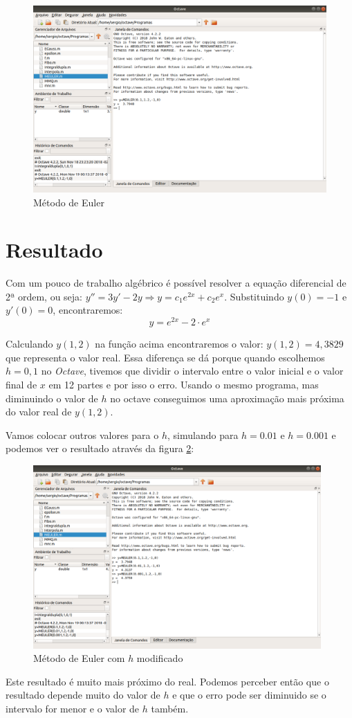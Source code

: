 \documentclass[11pt, openright, a4paper, brazil, openany, oneside]{abntex2}
\begin{document}
\begin{figure}[ht]

    \center

    \includegraphics[width=12cm]{octave3.png}
    \caption{Método de Euler \label{octave3}}
    
\end{figure}

\section{Resultado}

Com um pouco de trabalho algébrico é possível resolver a equação diferencial de 2ª ordem, ou seja: $y'' = 3y' - 2y \Rightarrow y=c_1e^{2x} + c_2e^{x}$. Substituindo $y(0) = -1$ e $y'(0) = 0$, encontraremos: 
$$y=e^{2x} - 2\cdot e^{x}$$

Calculando $y(1,2)$ na função acima encontraremos o valor: $y(1,2) = 4,3829$ que representa o valor real. Essa diferença se dá porque quando escolhemos $h = 0,1$ no \textit{Octave}, tivemos que dividir o intervalo entre o valor inicial e o valor final de $x$ em 12 partes e por isso o erro. Usando o mesmo programa, mas diminuindo o valor de $h$ no octave conseguimos uma aproximação mais próxima do valor real de $y(1,2)$.

Vamos colocar outros valores para o $h$, simulando para $h = 0.01$ e $h = 0.001$ e podemos ver o resultado através da figura \ref{octave4}:

\begin{figure}[ht]

    \center

    \includegraphics[width=11cm]{octave4.png}
    \caption{Método de Euler com $h$ modificado\label{octave4}}
    
\end{figure}

Este resultado é muito mais próximo do real. Podemos perceber então que o resultado depende muito do valor de $h$ e que o erro pode ser diminuido se o intervalo for menor e o valor de $h$ também.
\end{document}
